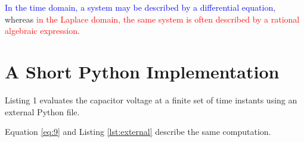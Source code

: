 \documentclass[a4paper,11pt]{article}
\begin{document}
\textcolor{blue}{In the time domain, a system may be described by a differential equation}, whereas \textcolor{red}{in the Laplace
domain, the same system is often described by a rational algebraic expression}.
\section{A Short Python Implementation}
Listing 1 evaluates the capacitor voltage at a finite set of time instants using an external Python
file.
\newpage

Equation \eqref{eq:9} and Listing \ref{lst:external} describe the same computation.

\end{document}
